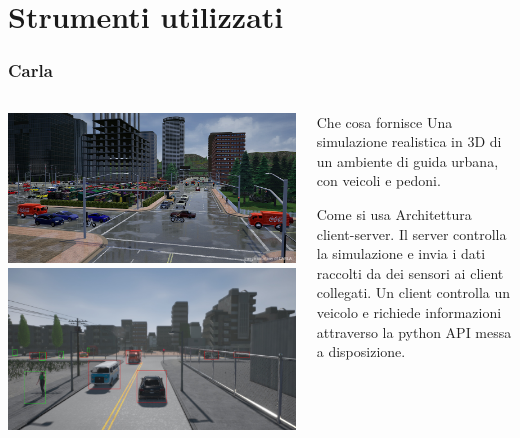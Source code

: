 \documentclass{beamer}
\begin{document}
\section{Strumenti utilizzati}
\begin{frame}
    \frametitle{Carla}
    \begin{columns}
        \begin{column}{0.5\textwidth}
            \includegraphics[width=\textwidth, height=0.3\textheight]{carla.jpg} 
            \includegraphics[width=\textwidth, height=0.3\textheight]{carlalogo.jpg} 
        \end{column}

        \begin{column}{0.5\textwidth}
              
    \begin{block}{Che cosa fornisce}
        Una simulazione realistica in 3D di un ambiente di guida urbana, con veicoli e pedoni.
    \end{block}
    
    \begin{block}{Come si usa}
        Architettura client-server. Il server controlla la simulazione e invia i dati raccolti da dei sensori ai client collegati.
        Un client controlla un veicolo e richiede informazioni attraverso la python API messa a disposizione.
    \end{block}
        \end{column}
    \end{columns}
\end{frame}
\end{document}
